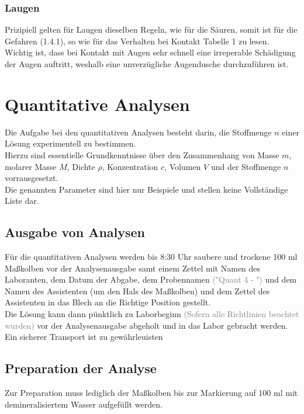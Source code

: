 \documentclass{article}
\begin{document}
\subsubsection{Laugen}
Prizipiell gelten für Laugen dieselben Regeln, wie für die Säuren, somit ist für die Gefahren (1.4.1), so wie für das Verhalten bei Kontakt Tabelle 1 zu lesen.\\
Wichtig ist, dass bei Kontakt mit Augen sehr schnell eine irreperable Schädigung der Augen auftritt, weshalb eine unverzügliche Augendusche durchzuführen ist.\\ 

\newpage

\section{Quantitative Analysen}
Die Aufgabe bei den quantitativen Analysen besteht darin, die Stoffmenge $n$ einer Lösung experimentell zu bestimmen.\\
Hierzu sind essentielle Grundkenntnisse über den Zusammenhang von Masse $m$, molarer Masse $M$, Dichte $\rho$, Konzentration $c$, Volumen $V$ und der Stoffmenge $n$ vorrausgesetzt.\\
Die genannten Parameter sind hier nur Beispiele und stellen keine Vollständige Liste dar.\\



\subsection{Ausgabe von Analysen}
Für die quantitativen Analysen werden bis 8:30 Uhr saubere und trockene 100 ml Maßkolben vor der Analysenausgabe samt einem Zettel mit Namen des Laboranten, dem Datum der Abgabe, dem Probennamen \textcolor{gray}{("Quant 4 - ")} und dem Namen des Assistenten (um den Hals des Maßkolben) und dem Zettel des Assistenten in das Blech an die Richtige Position gestellt.\\
Die Lösung kann dann pünktlich zu Laborbeginn \textcolor{gray}{(Sofern alle Richtlinien beachtet wurden)} vor der Analysenausgabe abgeholt und in das Labor gebracht werden. Ein sicherer Transport ist zu gewährleuisten\\


\subsection{Preparation der Analyse}
Zur Preparation muss lediglich der Maßkolben bis zur Markierung auf 100 ml  mit demineralisiertem Wasser aufgefüllt werden.
\end{document}
